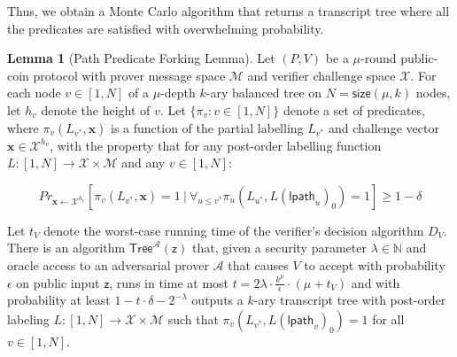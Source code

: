 \documentclass{article}
\theoremstyle{definition}
\newtheorem{lemma}{Lemma}
\begin{document}
Thus, we obtain a Monte Carlo algorithm that returns a transcript tree where all the predicates are satisfied with overwhelming probability. %

 
 \begin{lemma}[Path Predicate Forking Lemma]\label{lem:ppfl}
 Let $(P, V)$ be a $\mu$-round public-coin protocol with prover message space $\mathcal{M}$ and verifier challenge space $\mathcal{X}$. For each node $v \in [1,N]$ of a $\mu$-depth $k$-ary balanced tree on $N = \textsf{size}(\mu, k)$ nodes, let $h_v$ denote the height of $v$. Let $\{\pi_v: v \in [1,N]\}$ denote a set of predicates, where $\pi_v(L_{v^*}, \mathbf{x})$ is a function of the partial labelling $L_{v^*}$ and challenge vector $\mathbf{x} \in \mathcal{X}^{h_v}$, with the property that for any post-order labelling function $L:[1,N] \rightarrow \mathcal{X} \times \mathcal{M}$ and any $v \in [1,N]$: 

$$Pr_{\mathbf{x} \leftarrow \mathcal{X}^{h_v}}[ \pi_v(L_{v^*}, \mathbf{x}) = 1 \ | \ \forall_{u \leq v^*} \pi_u(L_{u^*},L(\textsf{lpath}_u)_0) = 1] \geq 1 - \delta$$

Let $t_V$ denote the worst-case running time of the verifier's decision algorithm $D_V$. There is an algorithm $\textsf{Tree}^\mathcal{A}(\mathsf{z})$ that, given a security parameter $\lambda \in \mathbb{N}$ and oracle access to an adversarial prover $\mathcal{A}$ that causes $V$ to accept with probability $\epsilon$ on public input $\mathsf{z}$, runs in time at most $t = 2\lambda \cdot \frac{k^\mu}{\epsilon} \cdot (\mu + t_V)$ and with probability at least $1 - t \cdot\delta - 2^{-\lambda}$ outputs a $k$-ary transcript tree with post-order labeling $L:[1,N] \rightarrow \mathcal{X}\times \mathcal{M}$ such that $\pi_v(L_{v^*}, L(\textsf{lpath}_v)_0) = 1$ for all $v \in [1,N]$.  	
 \end{lemma}
 
\end{document}
